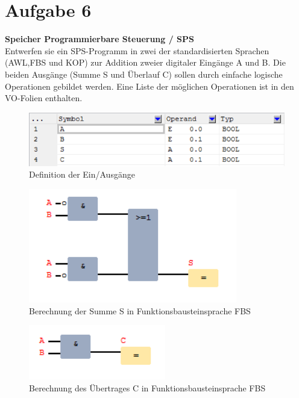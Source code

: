 \documentclass[12pt,a4paper,ngerman]{article}
\begin{document}
\pagebreak

\section{Aufgabe 6}
\begin{framed}
\textbf{Speicher Programmierbare Steuerung / SPS} \\
Entwerfen sie ein SPS-Programm in zwei der standardisierten Sprachen (AWL,FBS und KOP) zur Addition zweier digitaler Eingänge A und B. Die beiden Ausgänge (Summe S und Überlauf C) sollen durch einfache logische Operationen gebildet werden. Eine Liste der möglichen Operationen ist in den VO-Folien enthalten.
\end{framed}
   
\begin{figure}[h!]
\centering
\includegraphics[scale=1]{figures/Aufg6_EA.png} 
\caption{Definition der Ein/Ausgänge}
\end{figure}

\begin{figure}[h!]
\centering
\includegraphics[scale=1]{figures/Aufg6_S_FUP.png} 
\caption{Berechnung der Summe S in Funktionsbausteinsprache FBS}
\end{figure}

\begin{figure}[h!]
\centering
\includegraphics[scale=1]{figures/Aufg6_C_FUP.png} 
\caption{Berechnung des Übertrages C in Funktionsbausteinsprache FBS}
\end{figure}
\end{document}
